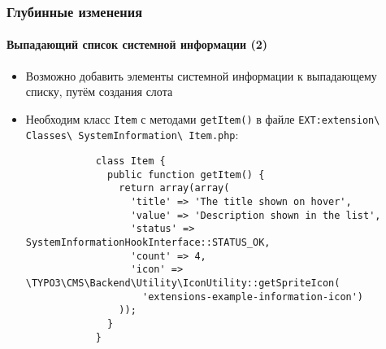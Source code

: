 \begin{frame}[fragile]
	\frametitle{Глубинные изменения}
	\framesubtitle{Выпадающий список системной информации (2)}

	\lstset{basicstyle=\tiny\ttfamily}

	\begin{itemize}

		\item Возможно добавить элементы системной информации к выпадающему списку, путём создания слота

		\item Необходим класс \texttt{Item} с методами \texttt{getItem()} в файле
			\small
				\texttt{EXT:extension\textbackslash
					Classes\textbackslash
					SystemInformation\textbackslash
					Item.php}:
			\normalsize

		\begin{lstlisting}
			class Item {
			  public function getItem() {
			    return array(array(
			      'title' => 'The title shown on hover',
			      'value' => 'Description shown in the list',
			      'status' => SystemInformationHookInterface::STATUS_OK,
			      'count' => 4,
			      'icon' => \TYPO3\CMS\Backend\Utility\IconUtility::getSpriteIcon(
				    'extensions-example-information-icon')
			    ));
			  }
			}
		\end{lstlisting}

	\end{itemize}

\end{frame}

